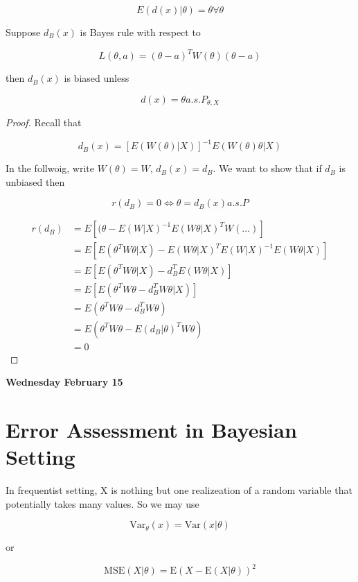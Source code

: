 \documentclass[11pt,fleqn]{book} %
\newcommand{\E}{\mathrm{E}}
\newcommand{\Var}{\mathrm{Var}}
\newcommand{\MSE}{\mathrm{MSE}}
\begin{document}
		$$E(d(x) | \theta) = \theta \forall \theta $$

\begin{theorem}[2.3 in notes]
	Suppose $d_B(x)$ is Bayes rule with respect to 

			$$ L(\theta, a) = (\theta - a)^T W(\theta)(\theta - a) $$

	then $d_B(x)$ is biased unless

			$$d(x) = \theta a. s. P_{\theta, X} $$
\end{theorem}


\begin{proof}
	Recall that 

			$$d_B(x) = \left[E(W(\theta)|X)\right]^{-1} E(W(\theta)\theta|X) $$

	 In the follwoig, write $W(\theta) = W$, $d_B(x) = d_B$. We want to show that if $d_B$ is unbiased then 

	 		$$r(d_B) = 0 \Leftrightarrow \theta = d_B(x) a.s. P $$

	 		\begin{align*}
	 			r(d_B) &= E\left[(\theta - E(W|X)^{-1}E(W\theta|X)^T W(\dots)\right]\\
	 				&= E\left[ E(\theta^T W \theta | X) - E(W\theta|X)^TE(W|X)^{-1} E(W\theta|X)\right]\\
	 				&=E\left[ E(\theta^T W \theta | X) - d_B^T E(W\theta|X)\right]\\
	 				&=E\left[ E(\theta^T W \theta  - d_B^T W\theta|X)\right]\\
	 				&= E(\theta^T W \theta  - d_B^T W\theta)\\
					&= E(\theta^T W \theta  - E(d_B|\theta)^T W\theta)\\
					&= 0
	 		\end{align*}
\end{proof}


\textbf{Wednesday February 15}\\

\section{Error Assessment in Bayesian Setting}

In frequentist setting, X is nothing but one realizeation of a random variable that potentially takes many values. So we may use

		$$\Var_\theta(x) = \Var(x|\theta) $$

or 

		$$\MSE(X|\theta) = \E(X - \E(X|\theta))^2 $$
\end{document}
